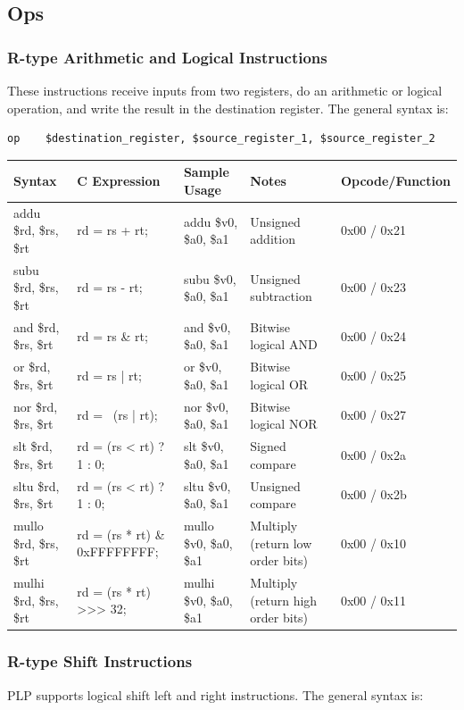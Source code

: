 \documentclass{article}
\begin{document}
\subsection{Ops}
\subsubsection{R-type Arithmetic and Logical Instructions}
These instructions receive inputs from two registers, do an arithmetic or logical operation, and write the result in the destination register. The general syntax is: 
\begin{verbatim}
op    $destination_register, $source_register_1, $source_register_2
\end{verbatim}
\begin{tabular}{| l | l | l | p{3cm} | l |}
\hline
Syntax	& C Expression & Sample Usage & Notes & Opcode/Function \\
\hline
addu \$rd, \$rs, \$rt &	rd = rs + rt; &	addu \$v0, \$a0, \$a1 &	Unsigned addition & 0x00 / 0x21 \\
subu \$rd, \$rs, \$rt &	rd = rs - rt; &	subu \$v0, \$a0, \$a1 &	Unsigned subtraction & 0x00 / 0x23 \\
and \$rd, \$rs, \$rt &	rd = rs \& rt; & and \$v0, \$a0, \$a1 &	Bitwise logical AND &0x00 / 0x24 \\
or \$rd, \$rs, \$rt &	rd = rs | rt; &	or \$v0, \$a0, \$a1 &	Bitwise logical OR &0x00 / 0x25 \\
nor \$rd, \$rs, \$rt &	rd = ~(rs | rt); & nor \$v0, \$a0, \$a1 & Bitwise logical NOR & 0x00 / 0x27 \\
slt \$rd, \$rs, \$rt &	rd = (rs < rt) ? 1 : 0;	& slt \$v0, \$a0, \$a1 & Signed compare	& 0x00 / 0x2a \\
sltu \$rd, \$rs, \$rt &	rd = (rs < rt) ? 1 : 0;	& sltu \$v0, \$a0, \$a1	& Unsigned compare & 0x00 / 0x2b \\
mullo \$rd, \$rs, \$rt & rd = (rs * rt) \& 0xFFFFFFFF; & mullo \$v0, \$a0, \$a1	& Multiply (return low order bits) & 0x00 / 0x10 \\
mulhi \$rd, \$rs, \$rt & rd = (rs * rt) >>> 32; & mulhi \$v0, \$a0, \$a1 & Multiply (return high order bits) & 0x00 / 0x11 \\
\hline
\end{tabular}
\subsubsection{R-type Shift Instructions}
PLP supports logical shift left and right instructions. The general syntax is:
\end{document}
